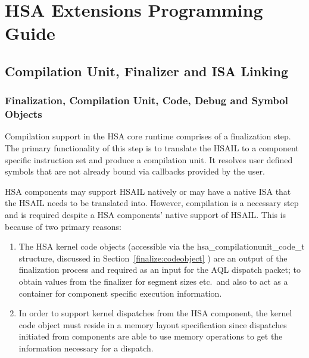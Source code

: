 \documentclass[draft]{book}
\newcommand{\reftyp}[1]{#1}
\begin{document}

%


\chapter{HSA Extensions Programming Guide}

\section{Compilation Unit, Finalizer and ISA Linking}
\label{finalizerchapter} \hypertarget{finalizerchapter}{}
\hypertarget{finalizer}{}\subsection{Finalization, Compilation Unit,
Code, Debug and Symbol Objects}\label{finalizer}

Compilation support in the HSA core runtime comprises of a finalization
step. The primary functionality of this step is to translate the HSAIL to a
component specific instruction set and produce a compilation unit. It resolves
user defined symbols that are not already bound via callbacks provided by the
user.

HSA components may support HSAIL natively or may have a native ISA that the
HSAIL needs to be translated into. However, compilation is a necessary step and
is required despite a HSA components' native support of HSAIL. This is because
of two primary reasons:

\begin{enumerate}
\item The HSA kernel code objects (accessible via the
  \reftyp{hsa_compilationunit_code_t} structure, discussed in
  Section~\ref{finalize:codeobject} ) are an output of the finalization process
  and required as an input for the AQL dispatch packet; to obtain values from
  the finalizer for segment sizes etc.\ and also to act as a container for
  component specific execution information.

\item In order to support kernel dispatches from the HSA component, the kernel
  code object must reside in a memory layout specification since dispatches
  initiated from components are able to use memory operations to get the
  information necessary for a dispatch.
\end{enumerate}
\end{document}
